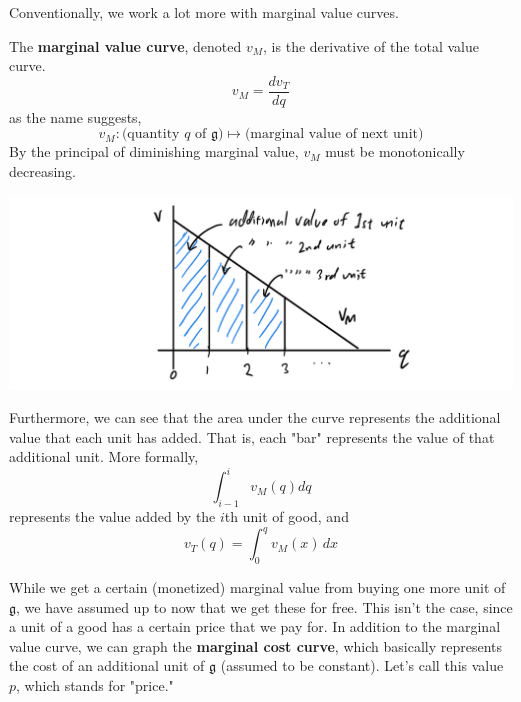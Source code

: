 \documentclass{article}
\begin{document}
    Conventionally, we work a lot more with marginal value curves. 

    \begin{definition}
      The \textbf{marginal value curve}, denoted $v_M$, is the derivative of the total value curve. 
      \[v_M = \frac{d v_T}{d q}\]
      as the name suggests, 
      \[v_M: \big( \text{quantity } q \text{ of } \mathfrak{g}\big) \mapsto \big(\text{marginal value of next unit} \big)\]
      By the principal of diminishing marginal value, $v_M$ must be monotonically decreasing. 
      \begin{center}
          \includegraphics[scale=0.25]{img/Marginal_Value_Curve.PNG}
      \end{center}
      Furthermore, we can see that the area under the curve represents the additional value that each unit has added. That is, each "bar" represents the value of that additional unit. More formally, 
      \[\int_{i-1}^{i} v_M (q) dq\]
      represents the value added by the $i$th unit of good, and 
      \[v_T (q) = \int_0^q v_M (x) \,dx\]
    \end{definition}

    While we get a certain (monetized) marginal value from buying one more unit of $\mathfrak{g}$, we have assumed up to now that we get these for free. This isn't the case, since a unit of a good has a certain price that we pay for. In addition to the marginal value curve, we can graph the \textbf{marginal cost curve}, which basically represents the cost of an additional unit of $\mathfrak{g}$ (assumed to be constant). Let's call this value $p$, which stands for "price." 
\end{document}
